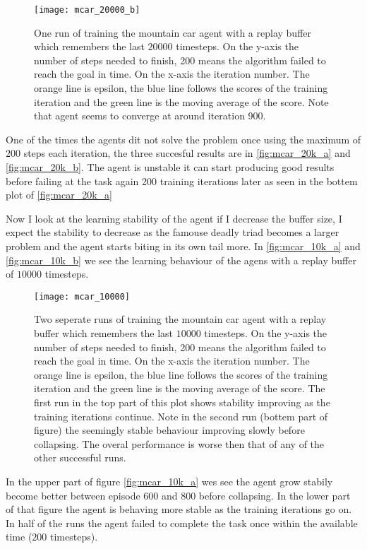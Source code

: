\begin{figure}
    \texttt{[image: mcar\_20000\_b]}
    \caption{One run of training the mountain car agent with a replay buffer which remembers the last $20000$ timesteps. On the y-axis the number of steps needed to finish, 200 means the algorithm failed to reach the goal in time. On the x-axis the iteration number. The orange line is epsilon, the blue line follows the scores of the training iteration and the green line is the moving average of the score. Note that agent seems to converge at around iteration 900.}
    \label{fig:mcar_20k_b}
\end{figure}

One of the times the agents dit not solve the problem once using the maximum of $200$ steps each iteration, the three succesful results are in \autoref{fig:mcar_20k_a} and \autoref{fig:mcar_20k_b}. The agent is unstable it can start producing good results before failing at the task again 200 training iterations later as seen in the bottem plot of \autoref{fig:mcar_20k_a}

Now I look at the learning stability of the agent if I decrease the buffer size, I expect the stability to decrease as the famouse deadly triad becomes a larger problem and the agent starts biting in its own tail more. In \autoref{fig:mcar_10k_a} and \autoref{fig:mcar_10k_b} we see the learning behaviour of the agens with a replay buffer of $10 000$ timesteps.

\begin{figure}
    \texttt{[image: mcar\_10000]}
    \caption{Two seperate runs of training the mountain car agent with a replay buffer which remembers the last $10000$ timesteps. On the y-axis the number of steps needed to finish, 200 means the algorithm failed to reach the goal in time. On the x-axis the iteration number. The orange line is epsilon, the blue line follows the scores of the training iteration and the green line is the moving average of the score. The first run in the top part of this plot shows stability improving as the training iterations continue. Note in the second run (bottem part of figure) the seemingly stable behaviour improving slowly   before collapsing. The overal performance is worse then that of any of the other successful runs.}
    \label{fig:mcar_10k_a}
\end{figure}

In the upper part of figure \autoref{fig:mcar_10k_a} wes see the agent grow stabily become better between episode 600 and 800 before collapsing. In the lower part of that figure the agent is behaving more stable as the training iterations go on. In half of the runs the agent failed to complete the task once within the available time ($200$ timesteps).

